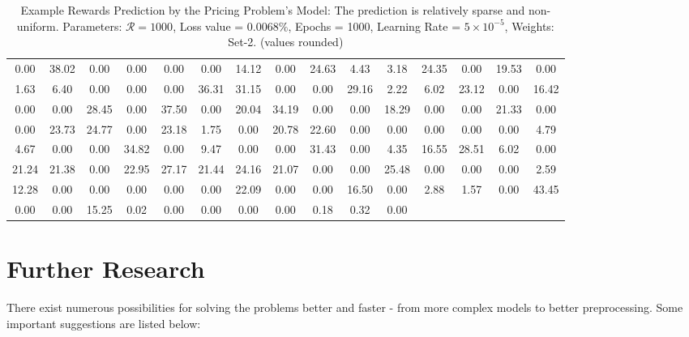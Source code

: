 \begin{table}[!htbp]
    \centering
    \caption[Example Rewards Prediction by the Pricing Problem's Model]{Example Rewards Prediction by the Pricing Problem's Model: The prediction is relatively sparse and non-uniform. Parameters: $\mathcal{R} = 1000$, Loss value = $0.0068\%$, Epochs = 1000, Learning Rate = $5 \times 10^{-5}$, Weights: Set-2. (values rounded)}
    \label{tab:Example Rewards Prediction by the Pricing Problem's Model}
    \setlength\tabcolsep{2pt}
    \begin{tabular}{|*{15}{c}|}
        \hline
        0.00 & 38.02 & 0.00 & 0.00 & 0.00 & 0.00 & 14.12 & 0.00 & 24.63 & 4.43 & 3.18 & 24.35 & 0.00 & 19.53 & 0.00\\
        1.63 & 6.40 & 0.00 & 0.00 & 0.00 & 36.31 & 31.15 & 0.00 & 0.00 & 29.16 & 2.22 & 6.02 & 23.12 & 0.00 & 16.42\\
        0.00 & 0.00 & 28.45 & 0.00 & 37.50 & 0.00 & 20.04 & 34.19 & 0.00 & 0.00 & 18.29 & 0.00 & 0.00 & 21.33 & 0.00\\
        0.00 & 23.73 & 24.77 & 0.00 & 23.18 & 1.75 & 0.00 & 20.78 & 22.60 & 0.00 & 0.00 & 0.00 & 0.00 & 0.00 & 4.79\\
        4.67 & 0.00 & 0.00 & 34.82 & 0.00 & 9.47 & 0.00 & 0.00 & 31.43 & 0.00 & 4.35 & 16.55 & 28.51 & 6.02 & 0.00\\
        21.24 & 21.38 & 0.00 & 22.95 & 27.17 & 21.44 & 24.16 & 21.07 & 0.00 & 0.00 & 25.48 & 0.00 & 0.00 & 0.00 & 2.59\\
        12.28 & 0.00 & 0.00 & 0.00 & 0.00 & 0.00 & 22.09 & 0.00 & 0.00 & 16.50 & 0.00 & 2.88 & 1.57 & 0.00 & 43.45\\
        0.00 & 0.00 & 15.25 & 0.02 & 0.00 & 0.00 & 0.00 & 0.00 & 0.18 & 0.32 & 0.00&&&&\\ \hline
    \end{tabular}
\end{table}

\section{Further Research}
There exist numerous possibilities for solving the problems better and faster - from more complex models to better preprocessing. Some important suggestions are listed below:

